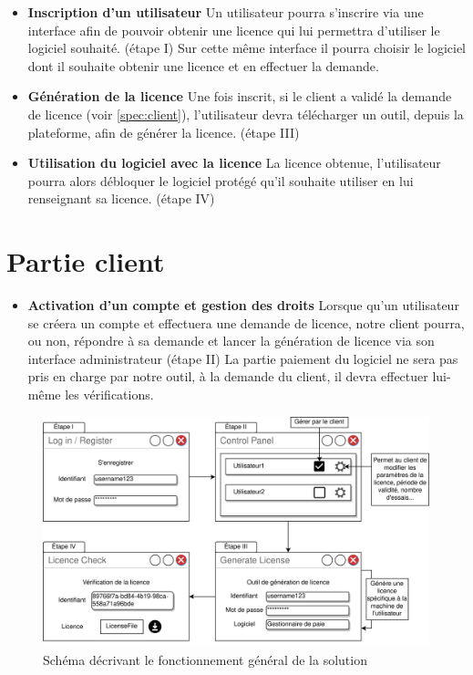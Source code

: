 \begin{itemize}
	\item \textbf{Inscription d'un utilisateur} \newline
	Un utilisateur pourra s'inscrire via une interface afin de pouvoir obtenir une licence qui lui permettra d'utiliser le logiciel souhaité. (étape I)
	Sur cette même interface il pourra choisir le logiciel dont il souhaite obtenir une licence et en effectuer la demande.
	\item \textbf{Génération de la licence} \newline
        Une fois inscrit, si le client a validé la demande de licence (voir \ref{spec:client}),
        l'utilisateur devra télécharger un outil, depuis la plateforme, afin de générer la
        licence. (étape III)
	\item \textbf{Utilisation du logiciel avec la licence} \newline
	La licence obtenue, l'utilisateur pourra alors débloquer le logiciel protégé qu'il souhaite utiliser en lui renseignant sa licence. (étape IV)
\end{itemize}

\section{Partie client}

\begin{itemize}
    \label{spec:client}
	\item \textbf{Activation d'un compte et gestion des droits} \newline
	Lorsque qu'un utilisateur se créera un compte et effectuera une demande de licence, notre client pourra, ou non, 
	répondre à sa demande et lancer la génération de licence via son interface administrateur (étape II)
	\newline
	La partie paiement du logiciel ne sera pas pris en charge par notre outil, à la demande du client,
	il devra effectuer lui-même les vérifications.
\end{itemize}

\newpage

\begin{figure}[h]
	\centering
	\vspace{4cm}
	\includegraphics[width=18cm]{main/png/STB.png}
	\caption{Schéma décrivant le fonctionnement général de la solution}
	\label{fig:fig1}
\end{figure}


